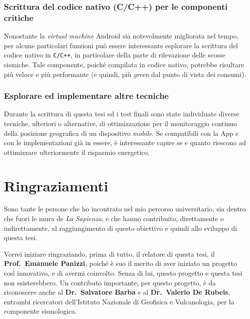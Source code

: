 \documentclass[a4paper,10pt]{memoir}
\begin{document}
\subsection{Scrittura del codice nativo (C/C++) per le componenti critiche}

Nonostante la \textit{virtual machine} Android sia notevolmente migliorata nel tempo, per alcune particolari funzioni può essere interessante esplorare la scrittura del codice nativo in \texttt{C/C++}, in particolare della parte di rilevazione delle scosse sismiche. Tale componente, poiché compilata in codice nativo, potrebbe risultare più veloce e più performante (e quindi, più \textit{green} dal punto di vista dei consumi).

\subsection{Esplorare ed implementare altre tecniche}

Durante la scrittura di questa tesi ed i test finali sono state individuate diverse tecniche, ulteriori o alternative, di ottimizzazione \cite{altrepub} per il monitoraggio continuo della posizione geografica di un dispositivo \textit{mobile}. Se compatibili con la App e con le implementazioni già in essere, è interessante capire se e quanto riescono ad ottimizzare ulteriormente il risparmio energetico.

\chapter*{Ringraziamenti}

Sono tante le persone che ho incontrato nel mio percorso universitario, sia dentro che fuori le mura de \textit{La Sapienza}, e che hanno contribuito, direttamente o indirettamente, al raggiungimento di questo obiettivo e quindi allo sviluppo di questa tesi.

\medskip

Vorrei iniziare ringraziando, prima di tutto, il relatore di questa tesi, il \textbf{Prof.~Emanuele Panizzi}, poiché è suo il merito di aver iniziato un progetto così innovativo, e di avermi coinvolto. Senza di lui, questo progetto e questa tesi non esisterebbero. Un contributo importante, per questo progetto, è da riconoscere anche al \textbf{Dr.~Salvatore Barba} e al \textbf{Dr.~Valerio De Rubeis}, entrambi ricercatori dell'Istituto Nazionale di Geofisica e Vulcanologia, per la componente sismologica.
\end{document}
